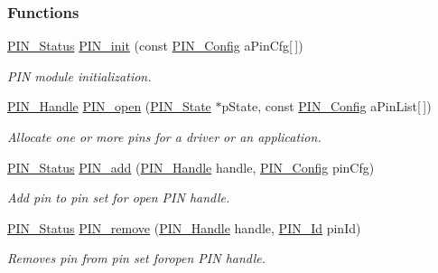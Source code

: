 \subsubsection*{Functions}
\begin{DoxyCompactItemize}
\item 
\hyperlink{_p_i_n_8h_abe0ad59bbf09e51fe37195a5e70b23f6}{P\+I\+N\+\_\+\+Status} \hyperlink{_p_i_n_8h_a0de1df98a14e6e13b16db414e54472ef}{P\+I\+N\+\_\+init} (const \hyperlink{_p_i_n_8h_ae427b7d2925f9b0f3145e455cfdb5841}{P\+I\+N\+\_\+\+Config} a\+Pin\+Cfg\mbox{[}$\,$\mbox{]})
\begin{DoxyCompactList}\small\item\em P\+I\+N module initialization. \end{DoxyCompactList}\item 
\hyperlink{_p_i_n_8h_afb2de52b054638f63c39df1f30a0d88d}{P\+I\+N\+\_\+\+Handle} \hyperlink{_p_i_n_8h_a731c5bb641ffeb064579432adfc8dba0}{P\+I\+N\+\_\+open} (\hyperlink{_p_i_n_8h_a36ef69d50df6baa6973482669c24a522}{P\+I\+N\+\_\+\+State} $\ast$p\+State, const \hyperlink{_p_i_n_8h_ae427b7d2925f9b0f3145e455cfdb5841}{P\+I\+N\+\_\+\+Config} a\+Pin\+List\mbox{[}$\,$\mbox{]})
\begin{DoxyCompactList}\small\item\em Allocate one or more pins for a driver or an application. \end{DoxyCompactList}\item 
\hyperlink{_p_i_n_8h_abe0ad59bbf09e51fe37195a5e70b23f6}{P\+I\+N\+\_\+\+Status} \hyperlink{_p_i_n_8h_ae96b7cc445336d52f8f6db762ff80156}{P\+I\+N\+\_\+add} (\hyperlink{_p_i_n_8h_afb2de52b054638f63c39df1f30a0d88d}{P\+I\+N\+\_\+\+Handle} handle, \hyperlink{_p_i_n_8h_ae427b7d2925f9b0f3145e455cfdb5841}{P\+I\+N\+\_\+\+Config} pin\+Cfg)
\begin{DoxyCompactList}\small\item\em Add pin to pin set for open P\+I\+N handle. \end{DoxyCompactList}\item 
\hyperlink{_p_i_n_8h_abe0ad59bbf09e51fe37195a5e70b23f6}{P\+I\+N\+\_\+\+Status} \hyperlink{_p_i_n_8h_a7edb10913792e741318ef339d5c7ef13}{P\+I\+N\+\_\+remove} (\hyperlink{_p_i_n_8h_afb2de52b054638f63c39df1f30a0d88d}{P\+I\+N\+\_\+\+Handle} handle, \hyperlink{_p_i_n_8h_a9ae8197f460bb76ea09a84f47d09921f}{P\+I\+N\+\_\+\+Id} pin\+Id)
\begin{DoxyCompactList}\small\item\em Removes pin from pin set foropen P\+I\+N handle. \end{DoxyCompactList}\item 

\end{DoxyCompactItemize}
